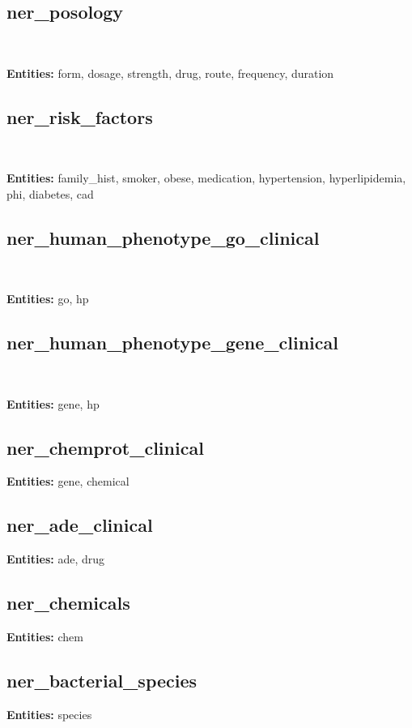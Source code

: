\documentclass[letterpaper]{article} \usepackage{aaai21}  \usepackage{times}  \usepackage{helvet} \usepackage{courier}  \usepackage[hyphens]{url}  \usepackage{graphicx} \urlstyle{rm} \def\UrlFont{\rm}  \usepackage{natbib}  \usepackage{caption} \frenchspacing  \setlength{\pdfpagewidth}{8.5in}  \setlength{\pdfpageheight}{11in}  \usepackage{lscape}
\begin{document}
\subsection{ner\_posology} 

~\cite{henry20202018}

\textbf{Entities:} form, dosage, strength, drug, route, frequency, duration                                                                     

\subsection{ner\_risk\_factors}

~\cite{stubbs2015identifying}

\textbf{Entities:} family\_hist, smoker, obese, medication, hypertension, hyperlipidemia, phi, diabetes, cad                               

\subsection{ner\_human\_phenotype\_go\_clinical}

~\cite{sousa2019silver}

\textbf{Entities:} go, hp                                                                                                                       

\subsection{ner\_human\_phenotype\_gene\_clinical}

~\cite{sousa2019silver}

\textbf{Entities:} gene, hp                                                                                                                     

\subsection{ner\_chemprot\_clinical}

\textbf{Entities:} gene, chemical

\subsection{ner\_ade\_clinical}

\textbf{Entities:} ade, drug                                                                                                                    

\subsection{ner\_chemicals}

\textbf{Entities:} chem                                                                                                                         

\subsection{ner\_bacterial\_species}

\textbf{Entities:} species        
\end{document}
